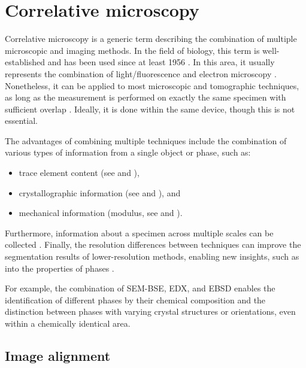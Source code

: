 \FloatBarrier
\section{Correlative microscopy}

Correlative microscopy is a generic term describing the combination of multiple microscopic and imaging methods.
In the field of biology, this term is well-established and has been used since at least 1956 \cite{bloch.1957}.
In this area, it usually represents the combination of light/fluorescence and electron microscopy \cite{bloch.1957,mironov.2013,loussertfonta.2015}.
Nonetheless, it can be applied to most microscopic and tomographic techniques, as long as the measurement is performed on exactly the same specimen with sufficient overlap \cite{loussertfonta.2015,daly.2017,mitchell.2019,mitchell.2021}.
Ideally, it is done within the same device, though this is not essential.

The advantages of combining multiple techniques include the combination of various types of information from a single object or phase, such as:
\begin{itemize}
    \item trace element content (see  and \cite{kleiner.2022b}),
    \item crystallographic information (see  and \cite{rossler.2022}), and
    \item mechanical information (modulus, see  and \cite{chen.2010, li.2025, li.2026}).
\end{itemize}
Furthermore, information about a specimen across multiple scales can be collected \cite{daly.2017,mitchell.2019,mitchell.2021,kleiner.2022a}.
Finally, the resolution differences between techniques can improve the segmentation results of lower-resolution methods, enabling new insights, such as into the properties of phases \cite{kleiner.2022b}.


For example, the combination of \ac{SEM}-\ac{BSE}, \ac{EDX}, and \ac{EBSD} enables the identification of different phases by their chemical composition and the distinction between phases with varying crystal structures or orientations, even within a chemically identical area.

\subsection{Image alignment}

